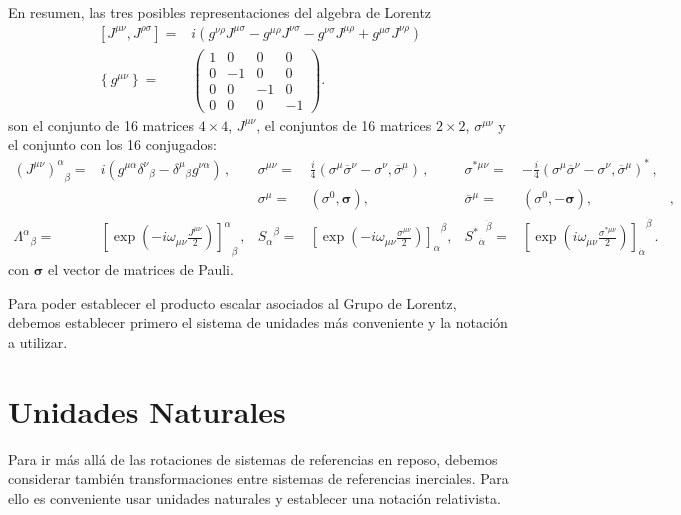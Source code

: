 \begin{frame}
En resumen, las tres posibles representaciones del algebra de Lorentz
\begin{align}
  \left[{J}^{\mu\nu},{J}^{\rho\sigma}\right]=&
i(g^{\nu\rho}{J}^{\mu\sigma}-g^{\mu\rho}{J}^{\nu\sigma}-g^{\nu\sigma}{J}^{\mu\rho}+g^{\mu\sigma}{J}^{\nu\rho})\nonumber\\
  \left\{ g^{\mu\nu} \right\}=&
  \begin{pmatrix}
    1&0&0&0\\
    0&-1&0&0\\
    0&0&-1&0\\
    0&0&0&-1
  \end{pmatrix}.
\end{align}
son el conjunto de 16 matrices $4\times4$, $J^{\mu\nu}$, el conjuntos de 16 matrices  $2\times2$, $\sigma^{\mu\nu}$ y el conjunto con los 16 conjugados:
\begin{align}
  {\left(J^{\mu\nu}\right)^{\alpha}}_{\beta}
  =&i\left(g^{\mu\alpha}{\delta^\nu}_\beta-{\delta^\mu}_\beta g^{\nu\alpha}\right)\,, &
  \sigma^{\mu\nu}=&\frac{i}{4}\left(\sigma^\mu\overline{\sigma}^\nu-\sigma^\nu,\overline{\sigma}^\mu\right)\,,&
  \sigma^{*\mu\nu}=&-\frac{i}{4}\left(\sigma^\mu\overline{\sigma}^\nu-\sigma^\nu,\overline{\sigma}^\mu\right)^{*}\,,\nonumber\\
 && \sigma^{\mu}=&
    \left( \sigma^0 , \boldsymbol{\sigma} \right),&
\overline{\sigma}^{\mu}=&
\left( \sigma^0 , -\boldsymbol{\sigma} \right),&,\nonumber\\
   {{\Lambda}^{\alpha}}_{\beta}=&{\left[ \exp\left(-i\omega_{\mu\nu}\frac{{J}^{\mu\nu}}{2}\right) \right]^{\alpha}}_{\beta}\,,&  {S_{\alpha}}^{\beta}=&{\left[\exp\left(-i \omega_{\mu\nu}\frac{\sigma^{\mu\nu}}{2}\right)  \right]_{\alpha}}^{\beta},&
{{S^{*}}_{\dot{\alpha}}}^{\dot{\beta}}=&{\left[ \exp\left(i \omega_{\mu\nu}\frac{\sigma^{*\mu\nu}}{2}\right)  \right]_{\dot{\alpha}}}^{\dot{\beta}}\,. \nonumber
\end{align}
con $\boldsymbol{\sigma}$ el vector de matrices de Pauli.
\end{frame}




Para poder establecer el producto escalar asociados al Grupo de Lorentz, debemos establecer primero el sistema de unidades más conveniente y la notación a utilizar.



\section{Unidades Naturales}
\label{sec:NU}
Para ir más allá de las rotaciones de sistemas de referencias en reposo, debemos considerar también transformaciones entre sistemas de referencias inerciales. Para ello es conveniente usar unidades naturales y establecer una notación relativista.


